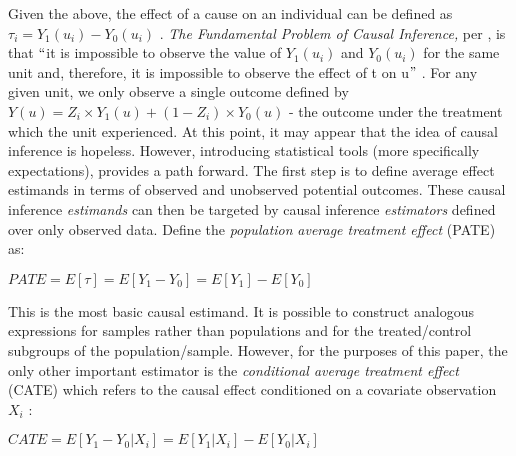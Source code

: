 \documentclass[../main.tex]{subfiles}
\begin{document}
\vspace{\baselineskip}
Given the above, the effect of a cause on an individual can be defined as  \(  \tau_{i}=Y_{1} \left( u_{i} \right)  - Y_{0} \left( u_{i} \right)   \) . \textit{The Fundamental Problem of Causal Inference,} per \cite{Holland1986StatisticsInference}, is that $``$it is impossible to observe the value of  \( Y_{1} \left( u_{i} \right)  \)  and  \( Y_{0} \left( u_{i} \right)  \) for the same unit and, therefore, it is impossible to observe the effect of t on u$"$ . For any given unit, we only observe a single outcome defined by  \( Y \left( u \right)  =Z_{i} \times Y_{1} \left( u \right) + \left( 1-Z_{i} \right)  \times Y_{0} \left( u \right)  \) - the outcome under the treatment which the unit experienced. At this point, it may appear that the idea of causal inference is hopeless. However, introducing statistical tools (more specifically expectations), provides a path forward. The first step is to define average effect estimands in terms of observed and unobserved potential outcomes. These causal inference \textit{estimands} can then be targeted by causal inference \textit{estimators }defined over only observed data. Define the \textit{population} \textit{average treatment effect }(PATE) as:\par


\vspace{\baselineskip}
\begin{adjustwidth}{0.5in}{0.0in}
 \( PATE = E \left[  \tau \right]  = E \left[ Y_{1} - Y_{0} \right]  = E \left[ Y_{1} \right]  - E \left[ Y_{0} \right]  \) \par

\end{adjustwidth}


\vspace{\baselineskip}
This is the most basic causal estimand. It is possible to construct analogous expressions for samples rather than populations and for the treated/control subgroups of the population/sample. However, for the purposes of this paper, the only other important estimator is the \textit{conditional average treatment effect }(CATE) which refers to the causal effect conditioned on a covariate observation  \( X_{i} \) :\par


\vspace{\baselineskip}
\begin{adjustwidth}{0.5in}{0.0in}
 \( CATE= E \left[ Y_{1} - Y_{0}  \vert  X_{i} \right]  =E \left[ Y_{1}  \vert  X_{i} \right]  - E \left[  Y_{0}  \vert  X_{i} \right]  \) \par

\end{adjustwidth}
\end{document}
